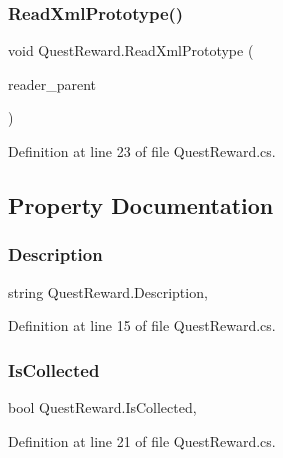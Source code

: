 \subsubsection{\texorpdfstring{Read\+Xml\+Prototype()}{ReadXmlPrototype()}}
{\footnotesize\ttfamily void Quest\+Reward.\+Read\+Xml\+Prototype (\begin{DoxyParamCaption}\item[{Xml\+Reader}]{reader\+\_\+parent }\end{DoxyParamCaption})}



Definition at line 23 of file Quest\+Reward.\+cs.



\subsection{Property Documentation}
\mbox{\label{class_quest_reward_a00f408d73c807e29e4bb68e3c8ba3319}} 
\subsubsection{\texorpdfstring{Description}{Description}}
{\footnotesize\ttfamily string Quest\+Reward.\+Description\hspace{0.3cm}{\ttfamily [get]}, {\ttfamily [set]}}



Definition at line 15 of file Quest\+Reward.\+cs.

\mbox{\label{class_quest_reward_ae3b7842d8d4d142a91e990c3351496b1}} 
\subsubsection{\texorpdfstring{Is\+Collected}{IsCollected}}
{\footnotesize\ttfamily bool Quest\+Reward.\+Is\+Collected\hspace{0.3cm}{\ttfamily [get]}, {\ttfamily [set]}}



Definition at line 21 of file Quest\+Reward.\+cs.

\mbox{\label{class_quest_reward_aaee12a40fcaaaa0de6f23b9b76e4661a}} 
